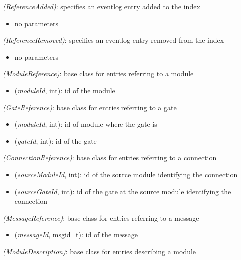  \textit{(ReferenceAdded)}: specifies an eventlog entry added to the index

\begin{itemize}
  \item no parameters
\end{itemize}

 \textit{(ReferenceRemoved)}: specifies an eventlog entry removed from the index

\begin{itemize}
  \item no parameters
\end{itemize}

 \textit{(ModuleReference)}: base class for entries referring to a module

\begin{itemize}
  \item {} (\textit{moduleId}, int): id of the module
\end{itemize}

 \textit{(GateReference)}: base class for entries referring to a gate

\begin{itemize}
  \item {} (\textit{moduleId}, int): id of module where the gate is
  \item {} (\textit{gateId}, int): id of the gate
\end{itemize}

 \textit{(ConnectionReference)}: base class for entries referring to a connection

\begin{itemize}
  \item {} (\textit{sourceModuleId}, int): id of the source module identifying the connection
  \item {} (\textit{sourceGateId}, int): id of the gate at the source module identifying the connection
\end{itemize}

 \textit{(MessageReference)}: base class for entries referring to a message

\begin{itemize}
  \item {} (\textit{messageId}, msgid\_t): id of the message
\end{itemize}

 \textit{(ModuleDescription)}: base class for entries describing a module

